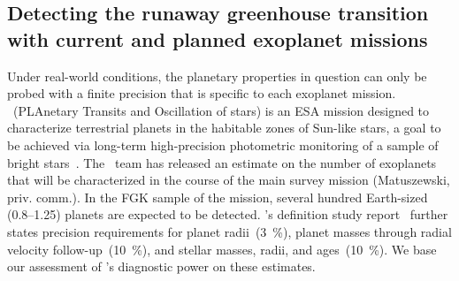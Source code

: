 \documentclass[twocolumn]{aastex631}
\begin{document}
\subsection{Detecting the runaway greenhouse transition with current and planned exoplanet missions}
Under real-world conditions, the planetary properties in question can only be probed with a finite precision that is specific to each exoplanet mission.
\plato\ (PLAnetary Transits and Oscillation of stars) is an ESA mission designed to characterize terrestrial planets in the habitable zones of Sun-like stars, a goal to be achieved via long-term high-precision photometric monitoring of a sample of bright stars~\citep{Rauer2016}.
The \plato\ team has released an estimate on the number of exoplanets that will be characterized in the course of the main survey mission (Matuszewski, priv. comm.).
In the FGK sample of the mission, several hundred Earth-sized (\SIrange{0.8}{1.25}{\rEarth}) planets are expected to be detected.
\plato's definition study report~\citep{plato2017} further states precision requirements for planet radii~(\SI{3}{\percent}), planet masses through radial velocity follow-up~(\SI{10}{\percent}), and stellar masses, radii, and ages~(\SI{10}{\percent}).
We base our assessment of \plato's diagnostic power on these estimates.
\end{document}
